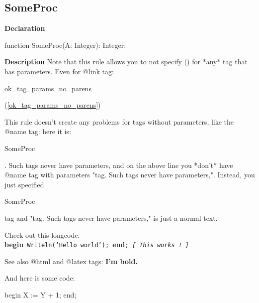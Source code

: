 \documentclass{report}
\newif\ifpdf
\begin{document}
\subsection*{SomeProc}
\fi
\label{ok_tag_params_no_parens-SomeProc}
\begin{list}{}{
\setlength{\itemindent}{0cm}
\setlength{\listparindent}{0cm}
\setlength{\leftmargin}{\evensidemargin}
\addtolength{\leftmargin}{\tmplength}
\settowidth{\labelsep}{X}
\addtolength{\leftmargin}{\labelsep}
\setlength{\labelwidth}{\tmplength}
}
\item[\textbf{Declaration}\hfill]
\ifpdf
\begin{flushleft}
\fi
\begin{ttfamily}
function SomeProc(A: Integer): Integer;\end{ttfamily}

\ifpdf
\end{flushleft}
\fi

\par
\item[\textbf{Description}]
Note that this rule allows you to not specify () for *any* tag that has parameters. Even for @link tag: \begin{ttfamily}ok{\_}tag{\_}params{\_}no{\_}parens\end{ttfamily}(\ref{ok_tag_params_no_parens})

This rule doesn't create any problems for tags without parameters, like the @name tag: here it is: \begin{ttfamily}SomeProc\end{ttfamily}. Such tags never have parameters, and on the above line you *don't* have @name tag with parameters "tag. Such tags never have parameters,". Instead, you just specified \begin{ttfamily}SomeProc\end{ttfamily} tag and "tag. Such tags never have parameters," is just a normal text.

Check out this longcode: \texttt{}\textbf{begin}\texttt{~Writeln('Hello~world');~}\textbf{end}\texttt{;~\textit{{\{}~This~works~!~{\}}}\\
}

See also @html and @latex tags:  {\bf I'm bold.}

And here is some code: \begin{ttfamily}begin X := Y + 1; end;\end{ttfamily}


\end{list}
\end{document}
